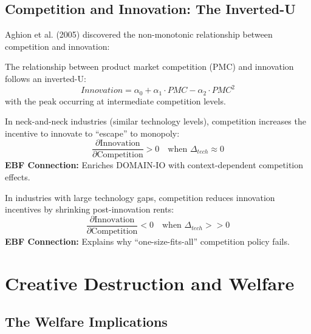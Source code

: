 \subsection{Competition and Innovation: The Inverted-U}

Aghion et al. (2005) discovered the non-monotonic relationship between competition and innovation:

\begin{theorem}
The relationship between product market competition (PMC) and innovation follows an inverted-U:
\begin{equation}
Innovation = \alpha_0 + \alpha_1 \cdot PMC - \alpha_2 \cdot PMC^2
\end{equation}
with the peak occurring at intermediate competition levels.
\end{theorem}

\begin{axiom}
\label{ax:pa2}
In neck-and-neck industries (similar technology levels), competition increases the incentive to innovate to ``escape'' to monopoly:
\begin{equation}
\frac{\partial \text{Innovation}}{\partial \text{Competition}} > 0 \quad \text{when } \Delta_{tech} \approx 0
\end{equation}
\textbf{EBF Connection:} Enriches DOMAIN-IO with context-dependent competition effects.
\end{axiom}

\begin{axiom}
\label{ax:pa3}
In industries with large technology gaps, competition reduces innovation incentives by shrinking post-innovation rents:
\begin{equation}
\frac{\partial \text{Innovation}}{\partial \text{Competition}} < 0 \quad \text{when } \Delta_{tech} >> 0
\end{equation}
\textbf{EBF Connection:} Explains why ``one-size-fits-all'' competition policy fails.
\end{axiom}

\section{Creative Destruction and Welfare}

\subsection{The Welfare Implications}

